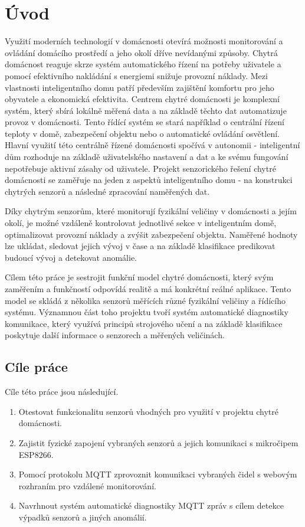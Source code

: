 \chapter{Úvod} \label{chap:introduction}
Využití moderních technologií v domácnosti otevírá možnosti monitorování a ovládání domácího prostředí a jeho okolí dříve nevídanými způsoby. Chytrá domácnost reaguje skrze systém automatického řízení na potřeby uživatele a pomocí efektivního nakládání s energiemi snižuje provozní náklady. Mezi vlastnosti inteligentního domu patří především zajištění komfortu pro jeho obyvatele a ekonomická efektivita. Centrem chytré domácnosti je komplexní systém, který sbírá lokálně měřená data a na základě těchto dat automatizuje provoz v domácnosti. Tento řídící systém se stará například o centrální řízení teploty v domě, zabezpečení objektu nebo o automatické ovládání osvětlení. Hlavní využití této centrálně řízené domácnosti spočívá v autonomii - inteligentní dům rozhoduje na základě uživatelského nastavení a dat a ke svému fungování nepotřebuje aktivní zásahy od uživatele. Projekt senzorického řešení chytré domácnosti se zaměřuje na jeden z aspektů inteligentního domu - na konstrukci chytrých senzorů a následné zpracování naměřených dat. \par  
Díky chytrým senzorům, které monitorují fyzikální veličiny v domácnosti a jejím okolí, je možné vzdáleně kontrolovat jednotlivé sekce v inteligentním domě, optimalizovat provozní náklady a zvýšit zabezpečení objektu. Naměřené hodnoty lze ukládat, sledovat jejich vývoj v čase a na základě klasifikace predikovat budoucí vývoj a detekovat anomálie. \par
Cílem této práce je sestrojit funkční model chytré domácnosti, který svým zaměřením a funkčností odpovídá realitě a má konkrétní reálné aplikace. Tento model se skládá z několika senzorů měřících různé fyzikální veličiny a řídícího systému. Významnou část toho projektu tvoří systém automatické diagnostiky komunikace, který využívá principů strojového učení a na základě klasifikace poskytuje další informace o senzorech a měřených veličinách. 

\section*{Cíle práce} \label{sec:thesis_objectives}
Cíle této práce jsou následující. 

\begin{enumerate}
   \item Otestovat funkcionalitu senzorů vhodných pro využití v projektu chytré domácnosti.
   \item Zajistit fyzické zapojení vybraných senzorů a jejich komunikaci s mikročipem ESP8266.
   \item Pomocí protokolu MQTT zprovoznit komunikaci vybraných čidel s webovým rozhraním pro vzdálené monitorování.
   \item Navrhnout systém automatické diagnostiky MQTT zpráv s cílem detekce výpadků senzorů a jiných anomálií.
\end{enumerate}

